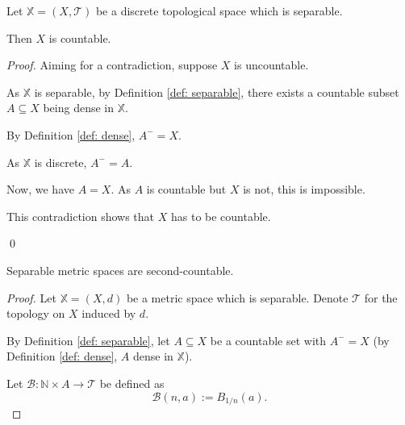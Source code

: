 \begin{proposition}
	Let $\mathbb X = (X, \mathcal T)$ be a discrete topological space which is separable.
	
	Then $X$ is countable.
	
	\begin{proof}
		Aiming for a contradiction, suppose $X$ is uncountable.
		
		As $\mathbb X$ is separable, by Definition \ref{def: separable}, there exists a countable subset $A \subseteq X$ being dense in $\mathbb X$.
		
		By Definition \ref{def: dense}, $A^- = X$.
		
		As $\mathbb X$ is discrete, $A^- = A$.
		
		Now, we have $A = X$. As $A$ is countable but $X$ is not, this is impossible.
		
		This contradiction shows that $X$ has to be countable.
		
		\qed
	\end{proof}
\end{proposition}


\begin{proposition}
	Separable metric spaces are second-countable.
	
	\begin{proof}
		Let $\mathbb X = (X, d)$ be a metric space which is separable. Denote $\mathcal T$ for the topology on $X$ induced by $d$.
		
		By Definition \ref{def: separable}, let $A \subseteq X$ be a countable set with $A^- = X$ (by Definition \ref{def: dense}, $A$ dense in $\mathbb X$).
		
		Let $\mathcal B: \mathbb N \times A \to \mathcal T$ be defined as
		$$
		\mathcal B(n, a) := B_{1/n}(a).
		$$
	\end{proof}
\end{proposition}



































%